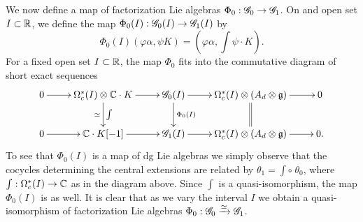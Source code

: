 We now define a map of factorization Lie algebras $\Phi_0 : \mathscr G_0 \to \mathscr G_1$. On and open set $I \subset \mathbb R$, we define the map $\Phi_0(I) : \mathscr G_0(I) \to \mathscr G_1(I)$ by
\[
\Phi_0(I)(\varphi \alpha, \psi K) = \left(\varphi \alpha, \int \psi \cdot K\right) .
\]
For a fixed open set $I \subset \mathbb R$, the map $\Phi_0$ fits into the commutative diagram of short exact sequences
\[
\xymatrix{
0 \ar[r] & \Omega^*_c(I) \tensor \CC \cdot K  \ar[d]^-{\int}_-{\simeq} \ar[r] & \sG_0(I) \ar[d]^-{\Phi_0(I)} \ar[r] & \Omega^*_c(I) \tensor (A_d \tensor \fg) \ar@{=}[d] \ar[r] & 0 \\
0 \ar[r] & \CC \cdot K [-1] \ar[r] & \sG_1(I) \ar[r] & \Omega^*_c(I) \tensor (A_d \tensor \fg) \ar[r] & 0 .
}
\]
To see that $\Phi_0(I)$ is a map of dg Lie algebras we simply observe that the cocycles determining the central extensions are related by $\theta_1 = \int \circ \; \theta_0$, where $\int : \Omega^*_c(I) \to \mathbb C$ as in the diagram above. Since $\int$ is a quasi-isomorphism, the map $\Phi_0(I)$ is as well. It is clear that as we vary the interval $I$ we obtain a quasi-isomorphism of factorization Lie algebras $\Phi_0 : \mathscr G_0 \xrightarrow{\simeq} \mathscr G_1$. 


